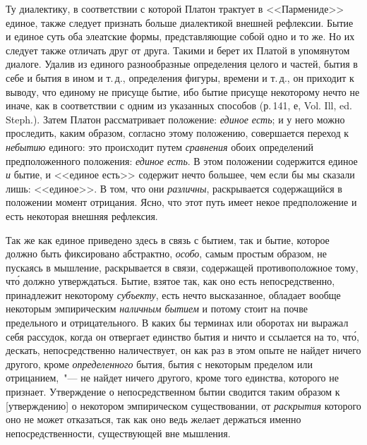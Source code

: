 Ту диалектику, в соответствии с которой Платон трактует
в <<Пармениде>> единое, также следует признать больше
диалектикой внешней рефлексии. Бытие и единое
суть оба элеатские формы, представляющие собой одно и
то же. Но их следует также отличать друг от друга. Такими
и берет их Платой в упомянутом диалоге. Удалив
из единого разнообразные определения целого и частей,
бытия в себе и бытия в ином и т.\,д., определения фигуры,
времени и т.\,д., он приходит к выводу, что единому не
присуще бытие, ибо бытие присуще некоторому нечто не
иначе, как в соответствии с одним из указанных способов
(р.\,141, е, Vol. Ill, ed. Steph.)\endnotemark{}. Затем Платон рассматривает
положение: \emph{единое есть}; и у него можно проследить,
каким образом, согласно этому положению, совершается
переход к \emph{небытию} единого: это происходит путем
\emph{сравнения} обоих определений предположенного положения:
\emph{единое есть}. В этом положении содержится единое
\emph{и} бытие, и <<единое есть>> содержит нечто большее, чем
если бы мы сказали лишь: <<единое>>. В том, что они \emph{различны},
раскрывается содержащийся в положении момент
отрицания. Ясно, что этот путь имеет некое предположение
и есть некоторая внешняя рефлексия.


Так же как единое приведено здесь в связь с бытием,
так и бытие, которое должно быть фиксировано абстрактно,
\emph{особо}, самым простым образом, не пускаясь в
мышление, раскрывается в связи, содержащей противоположное
тому, чт\'о должно утверждаться. Бытие, взятое
так, как оно есть непосредственно, принадлежит некоторому
\emph{субъекту}, есть нечто высказанное, обладает вообще
некоторым эмпирическим \emph{наличным бытием} и потому
стоит на почве предельного и отрицательного. В каких
бы терминах или оборотах ни выражал себя рассудок,
когда он отвергает единство бытия и ничто и ссылается
на то, чт\'о, дескать, непосредственно наличествует, он как
раз в этом опыте не найдет ничего другого, кроме \emph{определенного}
бытия, бытия с некоторым пределом или отрицанием,~"---
не найдет ничего другого, кроме того единства,
которого не признает. Утверждение о непосредственном
бытии сводится таким образом к [утверждению] о
некотором эмпирическом существовании, от \emph{раскрытия}
которого оно не может отказаться, так как оно ведь желает
держаться именно непосредственности, существующей
вне мышления.

